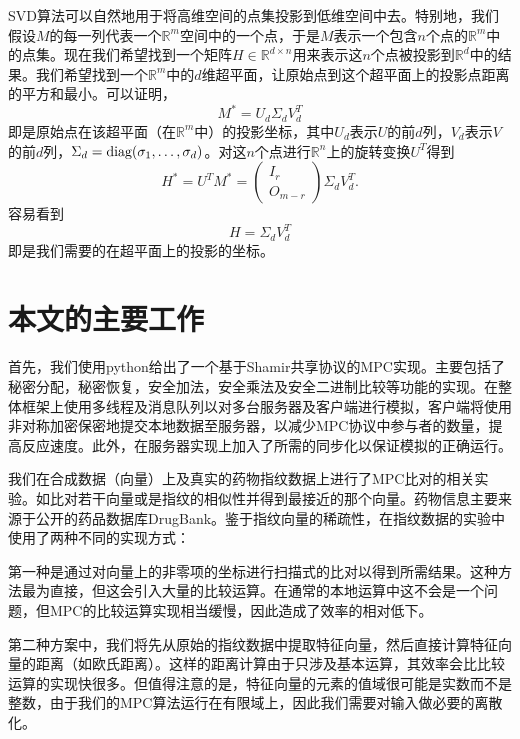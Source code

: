 SVD算法可以自然地用于将高维空间的点集投影到低维空间中去。特别地，我们假设$M$的每一列代表一个$\mathbb{R}^m$空间中的一个点，于是$M$表示一个包含$n$个点的$\mathbb{R}^m$中的点集。现在我们希望找到一个矩阵$H\in\mathbb{R}^{d\times n}$用来表示这$n$个点被投影到$\mathbb{R}^{d}$中的结果。我们希望找到一个$\mathbb{R}^m$中的$d$维超平面，让原始点到这个超平面上的投影点距离的平方和最小。可以证明，
\begin{equation}
M^*=U_d\Sigma_dV_d^T
\end{equation}
即是原始点在该超平面（在$\mathbb{R}^m$中）的投影坐标，其中$U_d$表示$U$的前$d$列，$V_d$表示$V$的前$d$列，$\Sigma_d=\textup{diag}(\sigma_1,\dots,\sigma_d)$。对这$n$个点进行$\mathbb{R}^n$上的旋转变换$U^T$得到
\begin{equation}
H^*=U^TM^*=\begin{pmatrix}
I_r\\ O_{m-r}
\end{pmatrix}
\Sigma_d V_d^T.
\end{equation}
容易看到
\begin{equation}
H=\Sigma_d V_d^T
\end{equation}
即是我们需要的在超平面上的投影的坐标。

\section{本文的主要工作}

首先，我们使用python给出了一个基于Shamir共享协议的MPC实现。主要包括了秘密分配，秘密恢复，安全加法，安全乘法及安全二进制比较等功能的实现。在整体框架上使用多线程及消息队列以对多台服务器及客户端进行模拟，客户端将使用非对称加密保密地提交本地数据至服务器，以减少MPC协议中参与者的数量，提高反应速度。此外，在服务器实现上加入了所需的同步化以保证模拟的正确运行。

我们在合成数据（向量）上及真实的药物指纹数据上进行了MPC比对的相关实验。如比对若干向量或是指纹的相似性并得到最接近的那个向量。药物信息主要来源于公开的药品数据库DrugBank。鉴于指纹向量的稀疏性，在指纹数据的实验中使用了两种不同的实现方式：
	
第一种是通过对向量上的非零项的坐标进行扫描式的比对以得到所需结果。这种方法最为直接，但这会引入大量的比较运算。在通常的本地运算中这不会是一个问题，但MPC的比较运算实现相当缓慢，因此造成了效率的相对低下。

第二种方案中，我们将先从原始的指纹数据中提取特征向量，然后直接计算特征向量的距离（如欧氏距离）。这样的距离计算由于只涉及基本运算，其效率会比比较运算的实现快很多。但值得注意的是，特征向量的元素的值域很可能是实数而不是整数，由于我们的MPC算法运行在有限域上，因此我们需要对输入做必要的离散化。
	
